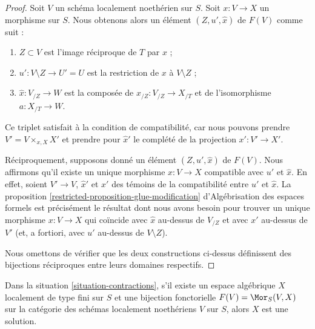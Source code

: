 \begin{proof}
Soit $V$ un schéma localement noethérien sur $S$.
Soit $x : V \to X$ un morphisme sur $S$.
Nous obtenons alors un élément $(Z, u', \hat x)$ de $F(V)$ comme suit :
\begin{enumerate}
\item $Z \subset V$ est l'image réciproque de $T$ par $x$ ;
\item $u' : V \setminus Z \to U' = U$ est la restriction de
$x$ à $V \setminus Z$ ;
\item $\hat x : V_{/Z} \to W$ est la composée de
$x_{/Z} : V_{/Z} \to X_{/T}$ et de l'isomorphisme $a : X_{/T} \to W$.
\end{enumerate}
Ce triplet satisfait à la condition de compatibilité, car nous pouvons prendre
$V' = V \times_{x, X} X'$ et prendre pour $\hat x'$ le complété de la
projection $x' : V' \to X'$.

\medskip\noindent
Réciproquement, supposons donné un élément $(Z, u', \hat x)$ de $F(V)$. Nous
affirmons qu'il existe un unique morphisme $x : V \to X$ compatible avec $u'$
et $\hat x$. En effet, soient $V' \to V$, $\hat x'$ et $x'$ des témoins de la
compatibilité entre $u'$ et $\hat x$. La proposition
\ref{restricted-proposition-glue-modification}
d'Algébrisation des espaces formels est précisément le résultat dont nous avons
besoin pour trouver un unique morphisme $x : V \to X$ qui coïncide avec
$\hat x$ au-dessus de $V_{/Z}$ et avec $x'$ au-dessus de $V'$ (et, a fortiori,
avec $u'$ au-dessus de $V \setminus Z$).

\medskip\noindent
Nous omettons de vérifier que les deux constructions ci-dessus définissent des
bijections réciproques entre leurs domaines respectifs.
\end{proof}

\begin{lemma}
\label{lemma-functor-is-solution}
Dans la situation \ref{situation-contractions}, s'il existe un espace
algébrique $X$ localement de type fini sur $S$ et une bijection fonctorielle
$F(V) = \Mor_S(V, X)$ sur la catégorie des schémas localement noethériens
$V$ sur $S$, alors $X$ est une solution.
\end{lemma}

